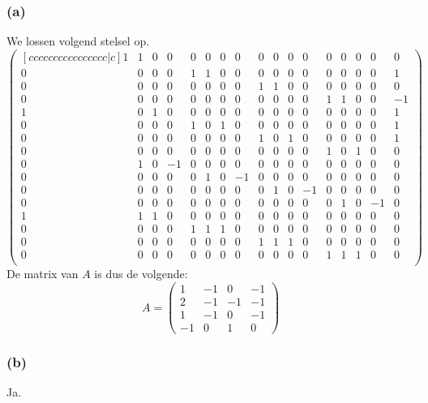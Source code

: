 \documentclass[lineaire_algebra_oplossingen.tex]{subfiles}
\begin{document}
\subsubsection*{(a)}
We lossen volgend stelsel op.
\[
\begin{pmatrix}[cccccccccccccccc|c]
1 & 1 & 0 & 0 & 0 & 0 & 0 & 0 & 0 & 0 & 0 & 0 & 0 & 0 & 0 & 0 & 0\\
0 & 0 & 0 & 0 & 1 & 1 & 0 & 0 & 0 & 0 & 0 & 0 & 0 & 0 & 0 & 0 & 1\\
0 & 0 & 0 & 0 & 0 & 0 & 0 & 0 & 1 & 1 & 0 & 0 & 0 & 0 & 0 & 0 & 0\\
0 & 0 & 0 & 0 & 0 & 0 & 0 & 0 & 0 & 0 & 0 & 0 & 1 & 1 & 0 & 0 & -1\\
1 & 0 & 1 & 0 & 0 & 0 & 0 & 0 & 0 & 0 & 0 & 0 & 0 & 0 & 0 & 0 & 1\\
0 & 0 & 0 & 0 & 1 & 0 & 1 & 0 & 0 & 0 & 0 & 0 & 0 & 0 & 0 & 0 & 1\\
0 & 0 & 0 & 0 & 0 & 0 & 0 & 0 & 1 & 0 & 1 & 0 & 0 & 0 & 0 & 0 & 1\\
0 & 0 & 0 & 0 & 0 & 0 & 0 & 0 & 0 & 0 & 0 & 0 & 1 & 0 & 1 & 0 & 0\\
0 & 1 & 0 & -1 & 0 & 0 & 0 & 0 & 0 & 0 & 0 & 0 & 0 & 0 & 0 & 0 & 0\\
0 & 0 & 0 & 0 & 0 & 1 & 0 & -1 & 0 & 0 & 0 & 0 & 0 & 0 & 0 & 0 & 0\\
0 & 0 & 0 & 0 & 0 & 0 & 0 & 0 & 0 & 1 & 0 & -1 & 0 & 0 & 0 & 0 & 0\\
0 & 0 & 0 & 0 & 0 & 0 & 0 & 0 & 0 & 0 & 0 & 0 & 0 & 1 & 0 & -1 & 0\\
1 & 1 & 1 & 0 & 0 & 0 & 0 & 0 & 0 & 0 & 0 & 0 & 0 & 0 & 0 & 0 & 0\\
0 & 0 & 0 & 0 & 1 & 1 & 1 & 0 & 0 & 0 & 0 & 0 & 0 & 0 & 0 & 0 & 0\\
0 & 0 & 0 & 0 & 0 & 0 & 0 & 0 & 1 & 1 & 1 & 0 & 0 & 0 & 0 & 0 & 0\\
0 & 0 & 0 & 0 & 0 & 0 & 0 & 0 & 0 & 0 & 0 & 0 & 1 & 1 & 1 & 0 & 0\\
\end{pmatrix}
\]
De matrix van $A$ is dus de volgende:
\[
A =
\begin{pmatrix}
1 & -1 & 0 & -1\\
2 & -1 & -1 & -1\\
1 & -1 & 0 & -1\\
-1 & 0 & 1 & 0
\end{pmatrix}
\]

\subsubsection*{(b)}
Ja.
\end{document}
